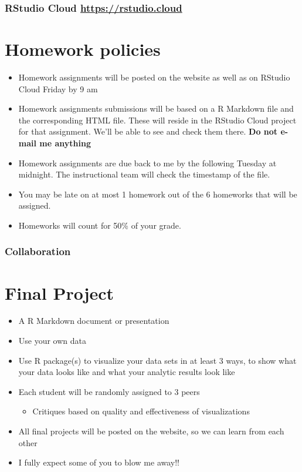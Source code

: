 \documentclass[12pt,letterpaperpaper,openany]{book}
\providecommand{\tightlist}{%
  \setlength{\itemsep}{0pt}\setlength{\parskip}{0pt}}
\begin{document}
\hypertarget{rstudio-cloud-httpsrstudio.cloud}{%
\subsubsection{\texorpdfstring{RStudio Cloud \url{https://rstudio.cloud}}{RStudio Cloud https://rstudio.cloud}}\label{rstudio-cloud-httpsrstudio.cloud}}

\hypertarget{homework-policies}{%
\section{Homework policies}\label{homework-policies}}

\begin{itemize}
\tightlist
\item
  Homework assignments will be posted on the website as well as on RStudio Cloud Friday by 9 am
\item
  Homework assignments submissions will be based on a R Markdown file and the corresponding HTML file. These will reside in the RStudio Cloud project for that assignment. We'll be able to see and check them there. \textbf{Do not e-mail me anything}
\item
  Homework assignments are due back to me by the following Tuesday at midnight. The instructional team will check the timestamp of the file.
\item
  You may be late on at most 1 homework out of the 6 homeworks that will be assigned.
\item
  Homeworks will count for 50\% of your grade.
\end{itemize}

\hypertarget{collaboration}{%
\subsubsection{Collaboration}\label{collaboration}}

\hypertarget{final-project}{%
\section{Final Project}\label{final-project}}

\begin{itemize}
\tightlist
\item
  A R Markdown document or presentation
\item
  Use your own data
\item
  Use R package(s) to visualize your data sets in at least 3 ways, to show what your data looks like and what your analytic results look like
\item
  Each student will be randomly assigned to 3 peers

  \begin{itemize}
  \tightlist
  \item
    Critiques based on quality and effectiveness of visualizations
  \end{itemize}
\item
  All final projects will be posted on the website, so we can learn from each other
\item
  I fully expect some of you to blow me away!!
\end{itemize}
\end{document}
